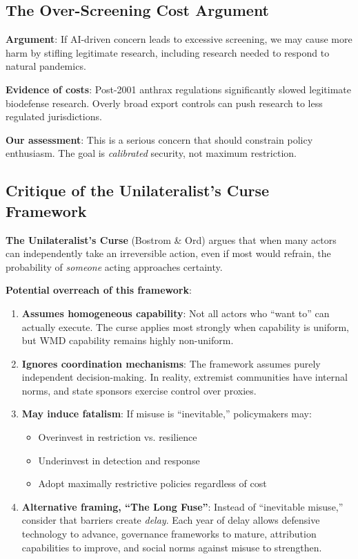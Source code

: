 \documentclass[11pt,letterpaper]{article}
\begin{document}
\subsection{The Over-Screening Cost Argument}

\textbf{Argument}: If AI-driven concern leads to excessive screening, we may cause more harm by stifling legitimate research, including research needed to respond to natural pandemics.

\textbf{Evidence of costs}: Post-2001 anthrax regulations significantly slowed legitimate biodefense research. Overly broad export controls can push research to less regulated jurisdictions.

\textbf{Our assessment}: This is a serious concern that should constrain policy enthusiasm. The goal is \textit{calibrated} security, not maximum restriction.

\subsection{Critique of the Unilateralist's Curse Framework}

\textbf{The Unilateralist's Curse} (Bostrom \& Ord) argues that when many actors can independently take an irreversible action, even if most would refrain, the probability of \textit{someone} acting approaches certainty.

\textbf{Potential overreach of this framework}:

\begin{enumerate}
  \item \textbf{Assumes homogeneous capability}: Not all actors who ``want to'' can actually execute. The curse applies most strongly when capability is uniform, but WMD capability remains highly non-uniform.

  \item \textbf{Ignores coordination mechanisms}: The framework assumes purely independent decision-making. In reality, extremist communities have internal norms, and state sponsors exercise control over proxies.

  \item \textbf{May induce fatalism}: If misuse is ``inevitable,'' policymakers may:
  \begin{itemize}[nosep]
    \item Overinvest in restriction vs. resilience
    \item Underinvest in detection and response
    \item Adopt maximally restrictive policies regardless of cost
  \end{itemize}

  \item \textbf{Alternative framing, ``The Long Fuse''}: Instead of ``inevitable misuse,'' consider that barriers create \textit{delay}. Each year of delay allows defensive technology to advance, governance frameworks to mature, attribution capabilities to improve, and social norms against misuse to strengthen.
\end{enumerate}
\end{document}
